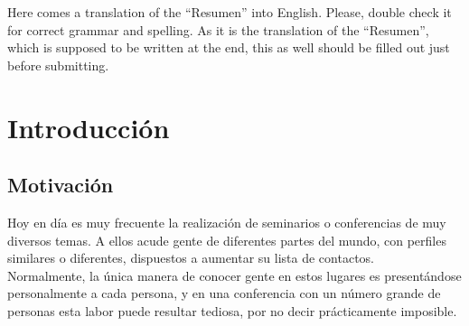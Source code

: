 \documentclass[a4paper, 12pt]{book}
\begin{document}
Here comes a translation of the ``Resumen'' into English. Please, double check it for correct grammar and spelling.
As it is the translation of the ``Resumen'', which is supposed to be written at the end, this as well should be filled out
just before submitting.




\tableofcontents
\cleardoublepage
\listoffigures %



\cleardoublepage
\chapter{Introducción}
\label{chap:intro} %

\section{Motivación}
\label{sec:motivacion}
Hoy en día es muy frecuente la realización de seminarios o conferencias de muy diversos temas. A ellos acude gente de diferentes partes del mundo, con perfiles similares o diferentes, dispuestos a aumentar su lista de contactos. \\

Normalmente, la única manera de conocer gente en estos lugares es presentándose personalmente a cada persona, y en una conferencia con un número grande de personas esta labor puede resultar tediosa, por no decir prácticamente imposible.\\
\end{document}
